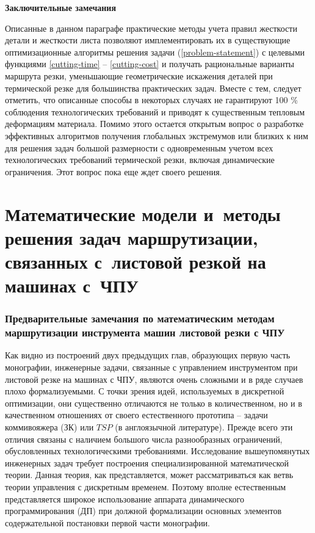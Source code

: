 \documentclass[11pt,twoside,openany]{report}
\newcounter{lem}
\begin{document}
{\bf Заключительные замечания}

Описанные в данном параграфе практические методы учета
правил жесткости детали и жесткости листа позволяют
имплементировать их в существующие оптимизационные
алгоритмы решения задачи (\ref{problem-statement})
с целевыми функциями \ref{cutting-time} -- \ref{cutting-cost}
и получать рациональные варианты маршрута резки,
уменьшающие геометрические искажения деталей
при термической резке для большинства практических задач.
Вместе с тем, следует отметить,
что описанные способы в некоторых случаях не гарантируют 100 \%
соблюдения технологических требований и
приводят к существенным тепловым деформациям материала.
Помимо этого остается открытым вопрос о разработке
эффективных алгоритмов получения глобальных экстремумов или
близких к ним для решения задач большой размерности с
одновременным учетом всех технологических требований
термической резки, включая динамические ограничения.
Этот вопрос пока еще ждет своего решения.

\part{
  Математические модели и~методы решения задач маршрутизации,
  связанных с~листовой резкой на машинах с~ЧПУ
}

{\raggedright\section*{
  Предварительные замечания по математическим методам
  маршрутизации инструмента машин листовой резки с ЧПУ
}}
\label{sect:2.4}
\setcounter{equation}{0}

Как видно из построений двух предыдущих глав,
образующих первую часть монографии,
инженерные задачи, связанные с управлением инструментом
при листовой резке на машинах с ЧПУ,
являются очень сложными и
в ряде случаев плохо формализуемыми.
С точки зрения идей,
используемых в дискретной оптимизации,
они существенно отличаются не только в количественном,
но и в качественном отношениях от своего естественного прототипа --
задачи коммивояжера (ЗК) или
$TSP$
(в англоязычной литературе).
Прежде всего эти отличия связаны с наличием
большого числа разнообразных ограничений,
обусловленных технологическими требованиями.
Исследование вышеупомянутых инженерных задач
требует построения специализированной математической теории.
Данная теория, как представляется,
может рассматриваться как ветвь теории управления
с дискретным временем.
Поэтому вполне естественным представляется
широкое использование аппарата динамического программирования
(ДП)
при должной формализации
основных элементов содержательной постановки первой части
монографии.
\end{document}
